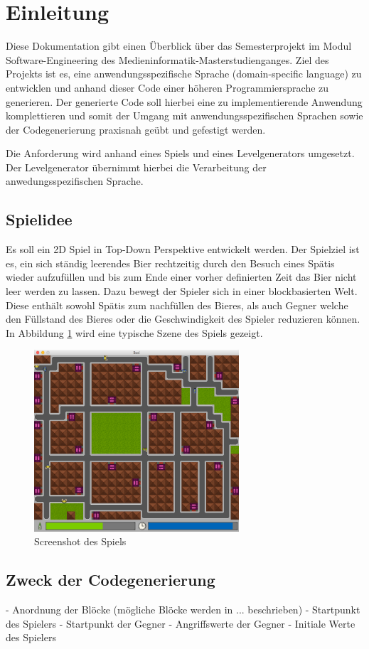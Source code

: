 \section{Einleitung}

Diese Dokumentation gibt einen Überblick über das Semesterprojekt im Modul Software-Engineering des Medieninformatik-Masterstudienganges.
Ziel des Projekts ist es, eine anwendungsspezifische Sprache (domain-specific language) zu entwicklen und anhand dieser Code einer höheren Programmiersprache zu generieren.
Der generierte Code soll hierbei eine zu implementierende Anwendung komplettieren und somit der Umgang mit anwendungsspezifischen Sprachen sowie der Codegenerierung praxisnah geübt und gefestigt werden.

Die Anforderung wird anhand eines Spiels und eines Levelgenerators umgesetzt.
Der Levelgenerator übernimmt hierbei die Verarbeitung der anwedungsspezifischen Sprache.

\subsection{Spielidee}

Es soll ein 2D Spiel in Top-Down Perspektive entwickelt werden.
Der Spielziel ist es, ein sich ständig leerendes Bier rechtzeitig durch den Besuch eines Spätis wieder aufzufüllen und bis zum Ende einer vorher definierten Zeit das Bier nicht leer werden zu lassen.
Dazu bewegt der Spieler sich in einer blockbasierten Welt.
Diese enthält sowohl Spätis zum nachfüllen des Bieres, als auch Gegner welche den Füllstand des Bieres oder die Geschwindigkeit des Spieler reduzieren können.
In Abbildung \ref{fig:einleitung:screenshot} wird eine typische Szene des Spiels gezeigt.

\begin{figure}[]
\centering
\includegraphics[width=3in]{img/02_screenshot.png}
\caption{Screenshot des Spiels}
\label{fig:einleitung:screenshot}
\end{figure}


\subsection{Zweck der Codegenerierung}
- Anordnung der Blöcke (mögliche Blöcke werden in ... beschrieben)
- Startpunkt des Spielers
- Startpunkt der Gegner
- Angriffswerte der Gegner
- Initiale Werte des Spielers